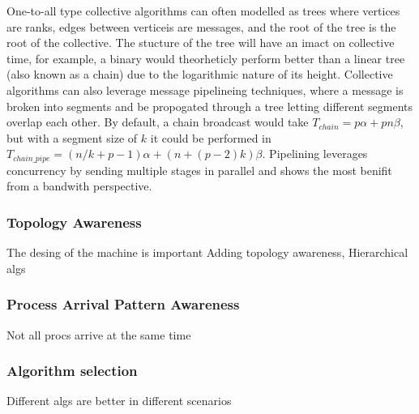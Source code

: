 One-to-all type collective algorithms can often modelled as trees where vertices are ranks, edges between verticeis are messages, and the root of the tree is the root of the collective.
The stucture of the tree will have an imact on collective time, for example, a binary would theorheticly perform better than a linear tree (also known as a chain) due to the logarithmic nature of its height.
Collective algorithms can also leverage message pipelineing techniques, where a message is broken into segments and be propogated through a tree letting different segments overlap each other.
By default, a chain broadcast would take $T_{chain}=p\alpha+pn\beta$, but with a segment size of $k$ it could be performed in $T_{chain\_pipe}=(n/k+p-1)\alpha+(n+(p-2)k)\beta$.
Pipelining leverages concurrency by sending multiple stages in parallel and shows the most benifit from a bandwith perspective.

\subsubsection{Topology Awareness}
The desing of the machine is important
Adding topology awareness, 
Hierarchical algs
\subsubsection{Process Arrival Pattern Awareness}
Not all procs arrive at the same time
\subsubsection{Algorithm selection}
Different algs are better in different scenarios

